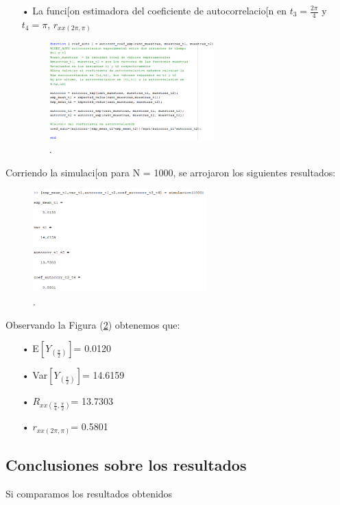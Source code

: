 \begin{enumerate}
\item[•] La funci[on estimadora del coeficiente de autocorrelacio[n en $t_3 = \frac{2\pi}{4}$ y $t_4 = \pi$, $r_{xx(2\pi,\pi)}$
\begin{figure}[H]
\centering
	\includegraphics[width=0.6\textwidth, trim = {0 0 0 0},clip]{./ImagenesEjercicio1/coefauto.png}
	\caption{.}
	\label{fig:coefauto}
\end{figure}
\end{enumerate}

Corriendo la simulaci[on para N = 1000, se arrojaron los siguientes resultados:
\begin{figure}[H]
\centering
	\includegraphics[width=0.6\textwidth, trim = {0 0 0 0},clip]{./ImagenesEjercicio1/result.png}
	\caption{.}
	\label{fig:result}
\end{figure}

Observando la Figura (\ref{fig:result}) obtenemos que:
\begin{enumerate}
	\item[•]E$\left[ Y_{(\frac{\pi}{2})}\right]$= 0.0120 
	\item[•]Var$\left[Y_{(\frac{\pi}{2})}\right]$= 14.6159
	\item[•]$R_{xx(\frac{\pi}{4},\frac{\pi}{2})}$= 13.7303
	\item[•]$r_{xx(2\pi,\pi)}$= 0.5801
\end{enumerate}


\subsection{Conclusiones sobre los resultados}

Si comparamos los resultados obtenidos 
